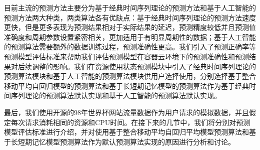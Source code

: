 目前主流的预测方法主要分为基于经典时间序列理论的预测方法和基于人工智能的预测方法两大种类，两类算法各有优缺点：基于经典时间序列理论的预测方法速度更快，但是更多表现为预测结果相对于实际结果的延迟，预测精度较低并且预测值准确度和周期参数设置紧密相关，更加适用于有明显周期性的数据；基于人工智能的预测算法需要额外的数据训练过程，预测准确性更高。我们引入了预测正确率等预测模型评估标准来帮助我们评估预测模型在容器云环境下的预测准确性和预测结果对后续调整的影响。我们在资源使用状态预测模块中引入了经典时间序列理论的预测算法模块和基于人工智能的预测算法模块供用户选择使用，分别选择基于整合移动平均自回归模型的预测算法和基于长短期记忆模型\cite{hochreiter1997long}的预测算法作为基于经典时间序列理论的预测算法默认实现和基于人工智能的预测算法默认实现。

最后，我们使用开源的98年世界杯网站流量数据\cite{arlitt2000workload}作为用户请求的模拟数据，并且假定每次请求消耗相同的资源和CPU时间。在接下来的几节中，我们将分别对预测模型评估标准进行介绍，并对使用基于整合移动平均自回归平均模型预测算法和基于长短期记忆模型预测算法作为默认预测算法实现的原因进行分析和讨论。

